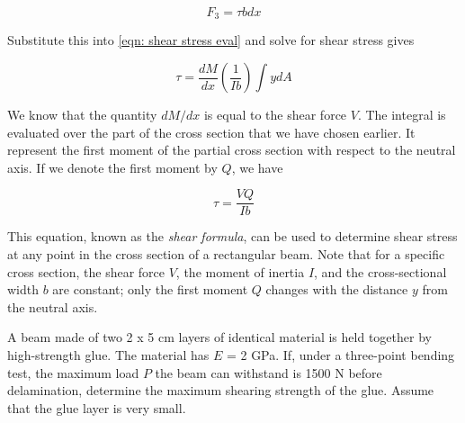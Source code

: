 \documentclass[
10pt,
a4paper,
openany,
svgnames,
]{kaobook} %
\begin{document}
\[F_3 = \tau bdx\]

Substitute this into \cref{eqn: shear stress eval} and solve for shear stress gives

\[\tau  = \frac{dM}{dx}\left( {\frac{1}{Ib}} \right) \int ydA \]

We know that the quantity $dM/dx$ is equal to the shear force $V$. The integral is evaluated over the part of the cross section that we have chosen earlier. It represent the first moment of the partial cross section with respect to the neutral axis. If we denote the first moment by $Q$, we have

\begin{equation}
  \tau  = \frac{VQ}{Ib}
\end{equation}

This equation, known as the \emph{shear formula}, can be used to determine shear stress at any point in the cross section of a rectangular beam. Note that for a specific cross section, the shear force $V$, the moment of inertia $I$, and the cross-sectional width $b$ are constant; only the first moment $Q$ changes with the distance $y$ from the neutral axis.

\begin{example}
  A beam made of two 2 x 5 cm layers of identical material is held together by high-strength glue. The material has $E$ = 2 GPa. If, under a three-point bending test, the maximum load $P$ the beam can withstand is 1500 N before delamination, determine the maximum shearing strength of the glue. Assume that the glue layer is very small.

  \begin{figure}[H]
    \centering
  \end{figure}
  
\end{example}
\end{document}
